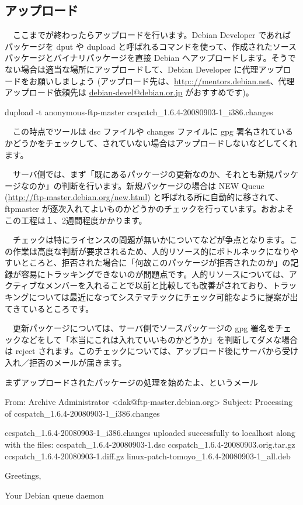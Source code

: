 \documentclass[mingoth,a4paper]{jsarticle}
\begin{document}
\subsection{アップロード}

　ここまでが終わったらアップロードを行います。Debian Developer であればパッケージを dput や dupload と呼ばれるコマンドを使って、作成されたソースパッケージとバイナリパッケージを直接 Debian へアップロードします。そうでない場合は適当な場所にアップロードして、Debian Developer に代理アップロードをお願いしましょう (アップロード先は、\url{http:://mentors.debian.net}、代理アップロード依頼先は \url{debian-devel@debian.or.jp} がおすすめです)。 

\begin{commandline}
dupload -t anonymous-ftp-master ccspatch_1.6.4-20080903-1_i386.changes
\end{commandline}

　この時点でツールは dsc ファイルや changes ファイルに gpg 署名されているかどうかをチェックして、されていない場合はアップロードしないなどしてくれます。

　サーバ側では、まず「既にあるパッケージの更新なのか、それとも新規パッケージなのか」の判断を行います。新規パッケージの場合は NEW Queue (\url{http://ftp-master.debian.org/new.html}) と呼ばれる所に自動的に移されて、ftpmaster が逐次入れてよいものかどうかのチェックを行っています。おおよそこの工程は１、2週間程度かかります。

　チェックは特にライセンスの問題が無いかについてなどが争点となります。この作業は高度な判断が要求されるため、人的リソース的にボトルネックになりやすいところと、拒否された場合に「何故このパッケージが拒否されたのか」の記録が容易にトラッキングできないのが問題点です。人的リソースについては、アクティブなメンバーを入れることで以前と比較しても改善がされており、トラッキングについては最近になってシステマチックにチェック可能なように提案が出てきているところです。

　更新パッケージについては、サーバ側でソースパッケージの gpg 署名をチェックなどをして「本当にこれは入れていいものかどうか」を判断してダメな場合は reject されます。このチェックについては、アップロード後にサーバから受け入れ／拒否のメールが届きます。

まずアップロードされたパッケージの処理を始めたよ、というメール

\begin{commandline}
From: Archive Administrator <dak@ftp-master.debian.org>
Subject: Processing of ccspatch_1.6.4-20080903-1_i386.changes

ccspatch_1.6.4-20080903-1_i386.changes uploaded successfully to localhost
along with the files:
  ccspatch_1.6.4-20080903-1.dsc
  ccspatch_1.6.4-20080903.orig.tar.gz
  ccspatch_1.6.4-20080903-1.diff.gz
  linux-patch-tomoyo_1.6.4-20080903-1_all.deb

Greetings,

	Your Debian queue daemon
\end{commandline}
\end{document}

